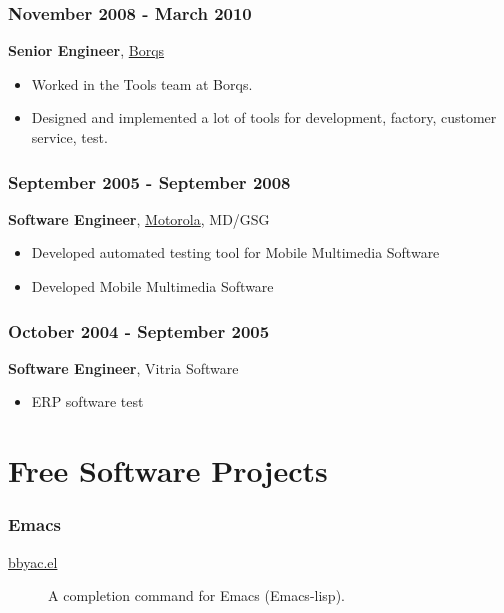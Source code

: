 \documentclass[11pt,dvipdfmx,CJKbookmarks]{article}
\begin{document}
\begin{CJK*}{UTF8}{simsun}
\subsubsection{November 2008 - March 2010}
\label{sec-1-0-5}

\textbf{Senior Engineer}, \href{http://www.borqs.com}{Borqs}

\begin{itemize}
\item Worked in the Tools team at Borqs.

\item Designed and implemented a lot of tools for development,
factory, customer service, test.
\end{itemize}

\subsubsection{September 2005 - September 2008}
\label{sec-1-0-6}

\textbf{Software Engineer}, \href{http://motorola.com}{Motorola},  MD/GSG

\begin{itemize}
\item Developed automated testing tool for Mobile Multimedia Software

\item Developed Mobile Multimedia Software
\end{itemize}

\subsubsection{October 2004 - September 2005}
\label{sec-1-0-7}
\textbf{Software Engineer}, Vitria Software

\begin{itemize}
\item ERP software test
\end{itemize}

\section{Free Software Projects}
\label{sec-2}

\subsubsection{Emacs}
\label{sec-2-0-1}
\begin{description}
\item[{\href{http://github.com/baohaojun/bbyac}{bbyac.el}}] A completion command for Emacs (Emacs-lisp).


\end{description}
\end{CJK*}
\end{document}
